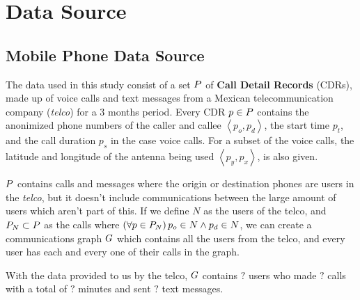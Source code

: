 \section{Data Source}

\subsection{Mobile Phone Data Source}

The data used in this study consist of a set \( \mathlarger{P} \) of \textbf{Call Detail Records} (CDRs), made up of voice calls and text messages from a Mexican telecommunication company (\textit{telco}) for a 3 months period.
Every CDR \( p \in \mathlarger{P} \)  contains the anonimized phone numbers of the caller and callee \( \left< p_o, p_d \right> \), the start time \( p_t \), and the call duration \( p_s \) in the case voice calls. 
For a subset of the voice calls, the latitude and longitude of the antenna being used \( \left< p_y, p_x \right> \), is also given.

\( \mathlarger{P} \) contains calls and messages where the origin or destination phones are users in the \textit{telco}, but it doesn't include communications between the large amount of users which aren't part of this. If we define \( N \) as the users of the telco, and \( \mathlarger{P}_N \subset \mathlarger{P} \) as the calls where \( \left( \forall p \in \mathlarger{P}_N \right) p_o \in N \wedge p_d \in N \), we can create a communications graph \( \mathlarger{G} \) which contains all the users from the telco, and every user has each and every one of their calls in the graph.

With the data provided to us by the telco, \( \mathlarger{G} \) contains \( ? \) users who made \( ? \) calls with a total of \( ? \) minutes and sent \( ? \) text messages.
